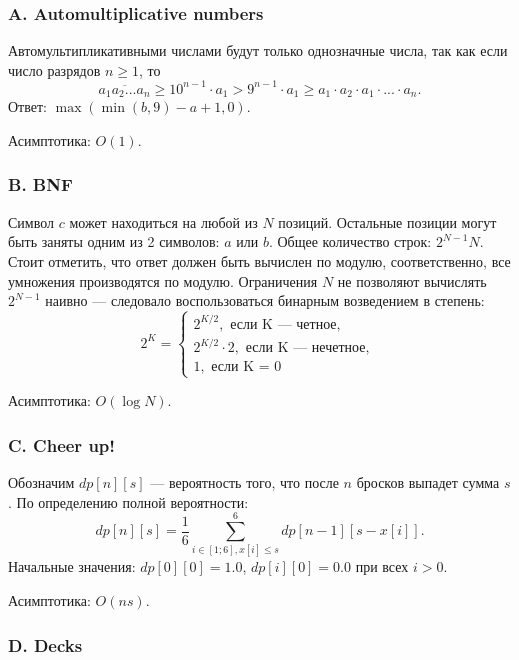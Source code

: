 \subsubsection*{A. Automultiplicative numbers} 


Автомультипликативными числами будут только однозначные числа, так как если число разрядов $n \geqslant 1$, то $$\overline{a_1 a_2 ... a_n} \geqslant 10^{n-1} \cdot a_1  > 9^{n-1} \cdot a_1 \geqslant a_1 \cdot a_2 \cdot a_1 \cdot ... \cdot a_n.$$ 
Ответ: $\max( \min(b, 9) - a + 1, 0 )$.

Асимптотика: $O(1)$.



\subsubsection*{B. BNF} 


Символ $c$ может находиться на любой из $N$ позиций. Остальные позиции могут быть заняты одним из 2 символов: $a$ или $b$. Общее количество строк: $2^{N-1} N$. Стоит отметить, что ответ должен быть вычислен по модулю, соответственно, все умножения производятся по модулю. Ограничения $N$ не позволяют вычислять $2^{N-1}$ наивно --- следовало воспользоваться бинарным возведением в степень:
$$2^K =
\begin{cases}
2^{K/2}, \text{ если K --- четное, } \\
2^{K/2} \cdot 2, \text{ если K --- нечетное, } \\
1, \text{ если K = 0 }
\end{cases}$$

Асимптотика: $O(\log{N})$.



\subsubsection*{C. Cheer up!} 

Обозначим $dp[n][s]$ --- вероятность того, что после $n$ бросков выпадет сумма $s$. По определению полной вероятности:
$$dp[n][s] = \frac16 \sum_{i \in [1;6], x[i] \leqslant s}^{6} dp[n-1][s-x[i]].$$
Начальные значения: $dp[0][0] = 1.0$, $dp[i][0] = 0.0$ при всех $i > 0$.

Асимптотика: $O(n s)$.



\subsubsection*{D. Decks} 

